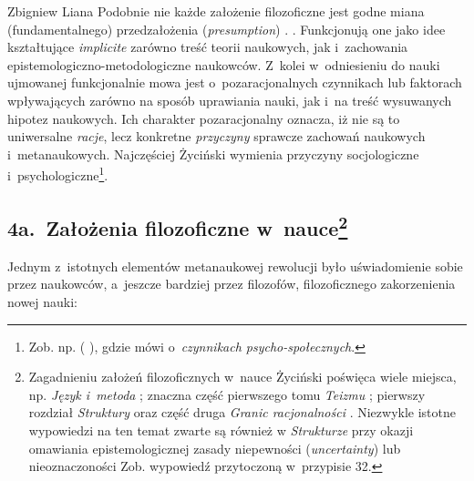 \begin{artplenv}{Zbigniew Liana}
{%
Podobnie nie każde założenie filozoficzne jest godne miana (fundamentalnego) przedzałożenia
(\textit{presumption})
\parencites[s.~143]{zycinski_structure_1988}[s.~253]{zycinski_struktura_2013}.
}. Funkcjonują one jako idee
kształtujące \textit{implicite} zarówno treść teorii naukowych, jak i~zachowania epistemologiczno-metodologiczne
naukowców. Z~kolei w~odniesieniu do nauki ujmowanej funkcjonalnie mowa jest o~pozaracjonalnych czynnikach lub faktorach
wpływających zarówno na sposób uprawiania nauki, jak i~na treść wysuwanych hipotez naukowych. Ich charakter
pozaracjonalny oznacza, iż nie są to uniwersalne\textit{ racje}, lecz konkretne \textit{przyczyny} sprawcze zachowań
naukowych i~metanaukowych. Najczęściej Życiński wymienia przyczyny socjologiczne i~psychologiczne\footnote{Zob. np. 
(\cites[s.~142nn]{zycinski_jezyk_1983}[s.~9]{zycinski_structure_1988}[s.~17]{zycinski_struktura_2013}
\cite*[a~także][s.~190]{zycinski_elementy_1996}),
gdzie
mówi o~\textit{czynnikach psycho-społecznych}.}.

\subsection{4a.~Założenia filozoficzne w~nauce\footnote{Zagadnieniu założeń filozoficznych w~nauce Życiński poświęca wiele miejsca,
np. \textit{Język i~metoda}
\parencite*[s.~246–261]{zycinski_jezyk_1983};
znaczna część pierwszego tomu
\textit{Teizmu} \parencite[s.~156–232]{zycinski_teizm_1985};
pierwszy rozdział \textit{Struktury} oraz część druga
\textit{Granic racjonalności} \parencite{zycinski_granice_1993}.
Niezwykle istotne wypowiedzi na ten temat zwarte są również w
\textit{Strukturze} przy okazji omawiania epistemologicznej zasady niepewności (\textit{uncertainty}) lub nieoznaczoności
\parencites[s.~143n]{zycinski_structure_1988}[s.~254–256]{zycinski_struktura_2013}
Zob. wypowiedź przytoczoną w~przypisie 32.}}

Jednym z~istotnych elementów metanaukowej rewolucji było uświadomienie sobie przez naukowców, a~jeszcze bardziej przez
filozofów, filozoficznego zakorzenienia nowej nauki:


\end{artplenv}
